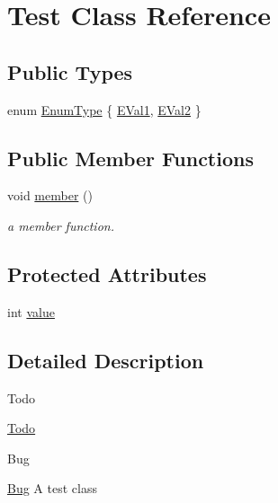 \hypertarget{class_test}{}\section{Test Class Reference}
\label{class_test}
\subsection*{Public Types}
\begin{DoxyCompactItemize}
\item 
enum \hyperlink{class_test_a26bf93efdaea3c6e2cfa4119c3755d3f}{Enum\+Type} \{ \hyperlink{class_test_a26bf93efdaea3c6e2cfa4119c3755d3faacfab1e4105c05a2e503931a0e82b5b0}{E\+Val1}, 
\hyperlink{class_test_a26bf93efdaea3c6e2cfa4119c3755d3fae2fa04fb1c4db1f7d72b8781ba19ffcc}{E\+Val2}
 \}
\end{DoxyCompactItemize}
\subsection*{Public Member Functions}
\begin{DoxyCompactItemize}
\item 
\hypertarget{class_test_ad86c7affdfb5ca8e720f44ef56169c50}{}void \hyperlink{class_test_ad86c7affdfb5ca8e720f44ef56169c50}{member} ()\label{class_test_ad86c7affdfb5ca8e720f44ef56169c50}

\begin{DoxyCompactList}\small\item\em a member function. \end{DoxyCompactList}\end{DoxyCompactItemize}
\subsection*{Protected Attributes}
\begin{DoxyCompactItemize}
\item 
int \hyperlink{class_test_ad55002283eba8ffa062dfb849f6c077c}{value}
\end{DoxyCompactItemize}


\subsection{Detailed Description}
\begin{DoxyRefDesc}{Todo}
\item[\hyperlink{todo__todo000001}{Todo}]\end{DoxyRefDesc}
\begin{DoxyRefDesc}{Bug}
\item[\hyperlink{bug__bug000001}{Bug}]A test class \end{DoxyRefDesc}


